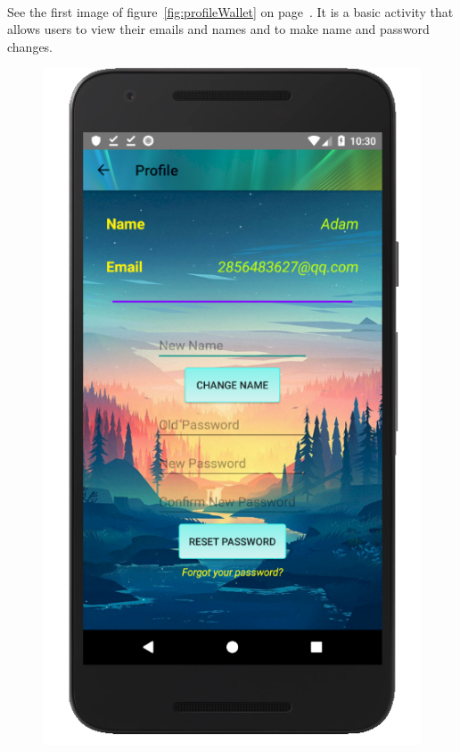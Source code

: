 \documentclass[12pt]{article}
\begin{document}
\paragraph{}
See the first image of figure~\ref{fig:profileWallet} on page~\pageref{fig:profileWallet}. It is a basic activity that allows users to view their emails and names and to make name and password changes.
\begin{figure}
	\centering
	\includegraphics[scale=0.25]{Profile.png}

\end{figure}
\end{document}

